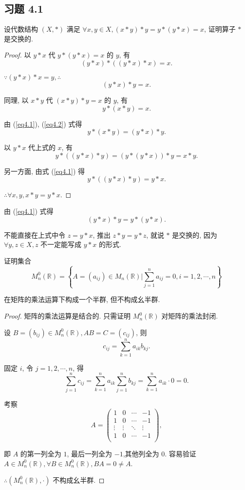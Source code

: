\documentclass[color=black,device=normal,lang=cn,mode=geye]{elegantnote}
\begin{document}
\subsection{习题 4.1}
\begin{exercise}%
    设代数结构 $(X,*)$ 满足 $\forall x,y\in X,(x*y)*y=y*(y*x)=x$, 证明算子 $*$ 是交换的.
\end{exercise}
\begin{proof}
    以 $y*x$ 代 $y*(y*x)=x$ 的 $y$, 有
    \[(y*x)*((y*x)*x)=x.\]

    $\because(y*x)*x=y,\therefore$
    \begin{equation}\label{eq4.1}
        (y*x)*y=x.
    \end{equation}

    同理, 以 $x*y$ 代 $(x*y)*y=x$ 的 $y$, 有
    \begin{equation}\label{eq4.2}
        y*(x*y)=x.
    \end{equation}

    由 (\ref{eq4.1}), (\ref{eq4.2}) 式得
    \[y*(x*y)=(y*x)*y.\]

    以 $y*x$ 代上式的 $x$, 有
    \[y*((y*x)*y)=(y*(y*x))*y=x*y.\]

    另一方面, 由式 (\ref{eq4.1}) 得
    \[y*((y*x)*y)=y*x.\]

    $\therefore\forall x,y,x*y=y*x$.
\end{proof}
\begin{note}
    由 (\ref{eq4.1}) 式得
    \[(y*x)*y=y*(y*x).\]

    不能直接在上式中令 $z=y*x$, 推出 $z*y=y*z$, 就说 $*$ 是交换的, 因为 $\forall y,z\in X,z$ 不一定能写成 $y*x$ 的形式.
\end{note}
\begin{exercise}%
    证明集合
    \[M_n^0(\mathbb{R})=\left\{A=(a_{ij})\in M_n(\mathbb{R})\Bigg|\sum\limits_{j=1}^{n}a_{ij}=0,i=1,2,\cdots,n\right\}\]

    在矩阵的乘法运算下构成一个半群, 但不构成幺半群.
\end{exercise}
\begin{proof}
    矩阵的乘法运算是结合的. 只需证明 $M_n^0(\mathbb{R})$ 对矩阵的乘法封闭.

    设 $B=(b_{ij})\in M_n^0(\mathbb{R}),AB=C=(c_{ij})$, 则
    \[c_{ij}=\sum_{k=1}^na_{ik}b_{kj}.\]

    固定 $i$, 令 $j=1,2,\cdots,n$, 得
    \[\sum\limits_{j=1}^{n}c_{ij}=\sum_{k=1}^na_{ik}\sum\limits_{j=1}^{n}b_{kj}=\sum_{k=1}^na_{ik}\cdot0=0.\]

    考察
    \[A=\begin{pmatrix}
        1 & 0 & \cdots & -1 \\
        1 & 0 & \cdots & -1 \\
        \vdots & \vdots & \ddots & \vdots \\
        1 & 0 & \cdots & -1 \\
    \end{pmatrix},\]

    即 $A$ 的第一列全为 $1$, 最后一列全为 $-1$,其他列全为 $0$. 容易验证 $A\in M_n^0(\mathbb{R}),\forall B\in M_n^0(\mathbb{R}),BA=0\neq A$.

    $\therefore(M_n^0(\mathbb{R}),\cdot)$ 不构成幺半群.
\end{proof}
\end{document}
